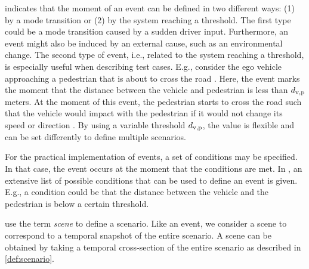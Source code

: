  indicates that the moment of an event can be defined in two different ways: \cstart(1) by a mode transition or (2) by the system reaching a threshold. 
The first type \cend\cstartd could be a mode transition \cendd\cstartf caused by \cendf\cstart a sudden driver input. Furthermore, an event might also be induced by an external cause, such as an environmental change. The second type of event, i.e., related to the system reaching a threshold, \cend is especially useful when describing test cases. E.g., consider the ego vehicle approaching a pedestrian that is about to cross the road \autocite{seiniger2015test}. 
Here, the event marks the moment that the distance between the vehicle and pedestrian is less than $d_{\mathrm{v,p}}$ meters. 
At the moment of this event, the pedestrian starts to cross the road such that the vehicle would impact with the pedestrian if it would not change its speed or direction \autocite{seiniger2015test}.
By using a variable threshold $d_{\mathrm{v,p}}$, the value is flexible and can be set differently to define multiple scenarios.

For the practical implementation of events, a set of conditions may be specified. In that case, the event occurs at the moment that the conditions are met. In \autocite{openscenario}, an extensive list of possible conditions that can be used to define an event is given. E.g., a condition could be that the distance between the vehicle and the pedestrian is below a certain threshold.

\cstarte\begin{remark}
	\textcite{geyer2014,ulbrich2015} use the term \emph{scene} to define a scenario.
	Like an event, we consider a scene to correspond to a temporal snapshot of the entire scenario. A scene can be obtained by taking a temporal cross-section of the entire scenario as described in \cref{def:scenario}.
\end{remark}\cende




